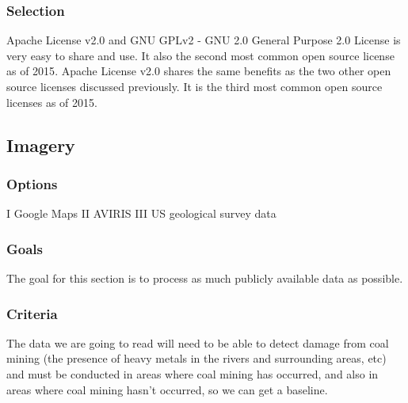 \documentclass[10pt,draftclsnofoot,onecolumn,journal,compsoc]{IEEEtran}
\begin{document}
\subsubsection{Selection}

\noindent  Apache License v2.0 and GNU GPLv2 - GNU 2.0 General Purpose 2.0 License is very easy to share and use. It also the second most common open source license as of 2015\cite{19}. Apache License v2.0 shares the same benefits as the two other open source licenses discussed previously. It is the third most common open source licenses as of 2015\cite{19}.

\subsection{Imagery}

\subsubsection{Options}

\noindent I Google Maps \newline
\noindent II AVIRIS \newline
\noindent III US geological survey data

\subsubsection{Goals}
\noindent The goal for this section is to process as much publicly available data as possible.

\subsubsection{Criteria}
\noindent The data we are going to
read will need to be able to detect damage from coal mining (the presence of heavy metals in the rivers and
surrounding areas, etc) and must be conducted in areas where coal mining has occurred, and also in areas where
coal mining hasn’t occurred, so we can get a baseline.
\end{document}
